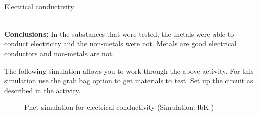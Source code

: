 \begin{i_experiment}{Electrical conductivity}
{\begin{table}[H]
\begin{center}
\begin{xtabular}[t]{|l|l|l|l|}
     \tabularnewline{}
         &
         &
         &
     \tabularnewline{}
    \end{xtabular}
      \end{center}
\end{table}
    \par
  \par 
      \label{m38706*id66494}\noindent{}\textbf{Conclusions:}
        \newline
  In the substances that were tested, the metals were able to conduct electricity and the non-metals were not. Metals are good electrical conductors and non-metals are not.\par }
            \end{i_experiment}
\label{m38706*eip-316}The following simulation allows you to work through the above activity. For this simulation use the grab bag option to get materials to test. Set up the circuit as described in the activity.
    \setcounter{subfigure}{0}
	\begin{figure}[H] %
    \textnormal{Phet simulation for electrical conductivity}\vspace{.1in} \nopagebreak
  \label{m38806*phet!!!underscore!!!sim}\label{m38806*phet-simulation}
             { (Simulation:  lbK )}
      \vspace{2pt}
    \vspace{.1in}
 \end{figure}    
        \par 
    \label{m38706*cid7}
